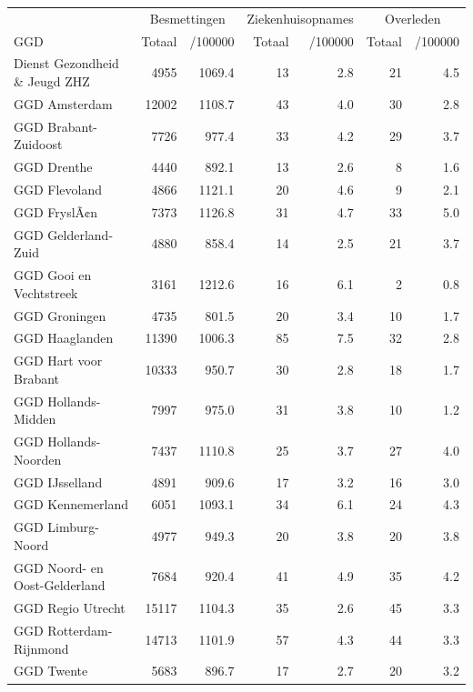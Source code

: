 \documentclass[
  english,
  man,floatsintext]{apa6}
\begin{document}
\begin{table}
\centering\begingroup\fontsize{10}{12}\selectfont

\begin{threeparttable}
\begin{tabular}{lrrrrrr}
\toprule
\multicolumn{1}{c}{ } & \multicolumn{2}{c}{Besmettingen} & \multicolumn{2}{c}{Ziekenhuisopnames} & \multicolumn{2}{c}{Overleden} \\
\cmidrule(l{3pt}r{3pt}){2-3} \cmidrule(l{3pt}r{3pt}){4-5} \cmidrule(l{3pt}r{3pt}){6-7}
GGD & Totaal & /100000 & Totaal & /100000 & Totaal & /100000\\
\midrule
Dienst Gezondheid \& Jeugd ZHZ & 4955 & 1069.4 & 13 & 2.8 & 21 & 4.5\\
GGD Amsterdam & 12002 & 1108.7 & 43 & 4.0 & 30 & 2.8\\
GGD Brabant-Zuidoost & 7726 & 977.4 & 33 & 4.2 & 29 & 3.7\\
GGD Drenthe & 4440 & 892.1 & 13 & 2.6 & 8 & 1.6\\
GGD Flevoland & 4866 & 1121.1 & 20 & 4.6 & 9 & 2.1\\
GGD FryslÃ¢n & 7373 & 1126.8 & 31 & 4.7 & 33 & 5.0\\
GGD Gelderland-Zuid & 4880 & 858.4 & 14 & 2.5 & 21 & 3.7\\
GGD Gooi en Vechtstreek & 3161 & 1212.6 & 16 & 6.1 & 2 & 0.8\\
GGD Groningen & 4735 & 801.5 & 20 & 3.4 & 10 & 1.7\\
GGD Haaglanden & 11390 & 1006.3 & 85 & 7.5 & 32 & 2.8\\
GGD Hart voor Brabant & 10333 & 950.7 & 30 & 2.8 & 18 & 1.7\\
GGD Hollands-Midden & 7997 & 975.0 & 31 & 3.8 & 10 & 1.2\\
GGD Hollands-Noorden & 7437 & 1110.8 & 25 & 3.7 & 27 & 4.0\\
GGD IJsselland & 4891 & 909.6 & 17 & 3.2 & 16 & 3.0\\
GGD Kennemerland & 6051 & 1093.1 & 34 & 6.1 & 24 & 4.3\\
GGD Limburg-Noord & 4977 & 949.3 & 20 & 3.8 & 20 & 3.8\\
GGD Noord- en Oost-Gelderland & 7684 & 920.4 & 41 & 4.9 & 35 & 4.2\\
GGD Regio Utrecht & 15117 & 1104.3 & 35 & 2.6 & 45 & 3.3\\
GGD Rotterdam-Rijnmond & 14713 & 1101.9 & 57 & 4.3 & 44 & 3.3\\
GGD Twente & 5683 & 896.7 & 17 & 2.7 & 20 & 3.2\\

\end{tabular}
\end{threeparttable}
\end{table}
\end{document}
